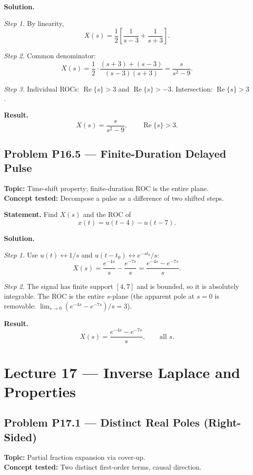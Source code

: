 \documentclass[11pt]{article}
\newcommand{\Real}{\operatorname{Re}}
\begin{document}
\textbf{Solution.}

\textit{Step 1.} By linearity,
\[
X(s) = \frac{1}{2}\!\left[\frac{1}{s-3}+\frac{1}{s+3}\right].
\]

\textit{Step 2.} Common denominator:
\[
X(s) = \frac{1}{2}\cdot\frac{(s+3)+(s-3)}{(s-3)(s+3)} = \frac{s}{s^{2}-9}.
\]

\textit{Step 3.} Individual ROCs: $\Real\{s\}>3$ and $\Real\{s\}>-3$.
Intersection: $\Real\{s\}>3$.

\textbf{Result.}
\[
\boxed{\,X(s) = \frac{s}{s^{2}-9},\qquad \Real\{s\}>3.\,}
\]

\subsection{Problem P16.5 --- Finite-Duration Delayed Pulse}
\textbf{Topic:} Time-shift property; finite-duration ROC is the entire plane.\\
\textbf{Concept tested:} Decompose a pulse as a difference of two shifted steps.

\textbf{Statement.} Find $X(s)$ and the ROC of
\[
x(t) = u(t-4) - u(t-7).
\]

\textbf{Solution.}

\textit{Step 1.} Use $u(t)\leftrightarrow 1/s$ and $u(t-t_{0})\leftrightarrow e^{-st_{0}}/s$:
\[
X(s) = \frac{e^{-4s}}{s} - \frac{e^{-7s}}{s} = \frac{e^{-4s}-e^{-7s}}{s}.
\]

\textit{Step 2.} The signal has finite support $[4,7]$ and is bounded, so
it is absolutely integrable. The ROC is the entire $s$-plane (the apparent
pole at $s=0$ is removable: $\lim_{s\to 0}(e^{-4s}-e^{-7s})/s = 3$).

\textbf{Result.}
\[
\boxed{\,X(s) = \frac{e^{-4s}-e^{-7s}}{s},\qquad \text{all }s.\,}
\]

\section{Lecture 17 --- Inverse Laplace and Properties}

\subsection{Problem P17.1 --- Distinct Real Poles (Right-Sided)}
\textbf{Topic:} Partial fraction expansion via cover-up.\\
\textbf{Concept tested:} Two distinct first-order terms, causal direction.
\end{document}
